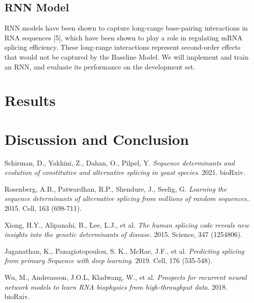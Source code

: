 \documentclass[10.5pt]{article}
\begin{document}
\subsection{RNN Model}
RNN models have been shown to capture long-range base-pairing interactions in RNA sequences [5], which have been shown to play a role in regulating mRNA splicing efficiency. These long-range interactions represent second-order effects that would not be captured by the Baseline Model. We will implement and train an RNN, and evaluate its performance on the development set.
\section{Results}
\section{Discussion and Conclusion}

\begin{thebibliography}{9}
Schirman, D., Yakhini, Z., Dahan, O., Pilpel, Y.
\textit{Sequence determinants and evolution of constitutive and alternative splicing in yeast species}. 2021. bioRxiv. 

Rosenberg, A.B., Patwardhan, R.P., Shendure, J., Seelig, G.
\textit{Learning the sequence determinants of alternative splicing from millions of random sequences.}. 2015. Cell, 163 (698-711). 

Xiong, H.Y., Alipanahi, B., Lee, L.J., et al. 
\textit{The human splicing code reveals new insights into the genetic determinants of disease.} 2015. Science, 347 (1254806).

Jaganathan, K., Panagiotopoulou, S. K., McRae, J.F., et al. 
\textit{Predicting splicing from primary Sequence with deep learning}. 2019. Cell, 176 (535-548). 

Wu, M., Andreasson, J.O.L, Kladwang, W., et al. \textit{Prospects for recurrent neural network models to learn RNA
biophysics from high-throughput data}. 2018. bioRxiv.
\end{thebibliography}
\end{document}
